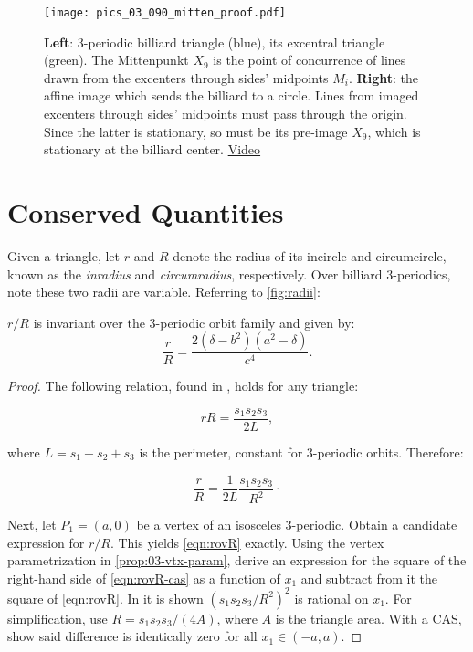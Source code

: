 \begin{figure}
     \centering
    \texttt{[image: pics\_03\_090\_mitten\_proof.pdf]}
     \caption{\textbf{Left}: 3-periodic billiard triangle (blue), its excentral triangle (green). The Mittenpunkt $X_9$ is the point of concurrence of lines drawn from the excenters through sides' midpoints $M_i$. \textbf{Right}: the affine image which sends the billiard to a circle. Lines from imaged excenters through sides' midpoints must pass through the origin. Since the latter is stationary, so must be its pre-image $X_9$, which is stationary at the billiard center.  %
     \href{https://youtu.be/tMrBqfRBYik}{Video}}
     \label{fig:03-x9} 
\end{figure}

\section{Conserved Quantities}

Given a triangle, let $r$ and $R$ denote the radius of its incircle and circumcircle, known as the {\em inradius} and {\em circumradius}, respectively. Over billiard 3-periodics, note these two radii are variable. Referring to \cref{fig:radii}:

\begin{theorem}
$r/R$ is invariant over the 3-periodic orbit family and given by:
\begin{equation*}
\label{eqn:rovR}
\frac{r}{R}=\frac{2 (\delta-b^2)(a^2-\delta)}{c^4}.
\end{equation*}
\label{thm:03-confocal-rovR}
\end{theorem}

\begin{proof}
The following relation, found in \cite{johnson1960}, holds for any triangle:

\begin{equation*}
 r R=\frac{s_1s_2s_3}{2 L}, 
\end{equation*}

\noindent where $L=s_1+s_2+s_3$ is the perimeter, constant for 3-periodic orbits. Therefore:

\begin{equation}
\frac{r}{R}=\frac{1}{2L} \frac{s_1s_2s_3}{R^2}\cdot
\label{eqn:rovR-cas}
\end{equation}

Next, let $P_1=(a,0)$ be a vertex of an isosceles 3-periodic. Obtain a candidate expression for $r/R$. This yields \eqref{eqn:rovR} exactly. Using the vertex parametrization in \cref{prop:03-vtx-param}, derive an expression for the square of the right-hand side of \eqref{eqn:rovR-cas} as a function of $x_1$ and subtract from it the square of \eqref{eqn:rovR}. In  \cite{garcia2020-new-properties}
it is shown $\left(s_1s_2s_3/R^2\right)^2$ is rational on $x_1$. For simplification, use $R=s_1 s_2 s_3/(4A)$, where $A$ is the triangle area. With a CAS, show said difference is identically zero for all $x_1\in(-a,a)$.
\end{proof}



